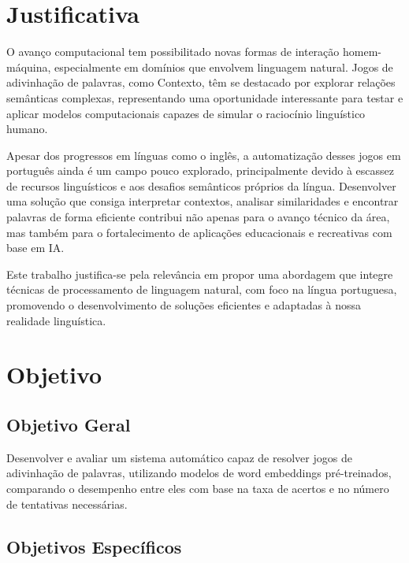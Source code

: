 \section{Justificativa}

O avanço computacional tem possibilitado novas formas de interação homem-máquina, especialmente em domínios que envolvem linguagem natural. Jogos de adivinhação de palavras, como Contexto, têm se destacado por explorar relações semânticas complexas, representando uma oportunidade interessante para testar e aplicar modelos computacionais capazes de simular o raciocínio linguístico humano.

Apesar dos progressos em línguas como o inglês, a automatização desses jogos em português ainda é um campo pouco explorado, principalmente devido à escassez de recursos linguísticos e aos desafios semânticos próprios da língua. Desenvolver uma solução que consiga interpretar contextos, analisar similaridades e encontrar palavras de forma eficiente contribui não apenas para o avanço técnico da área, mas também para o fortalecimento de aplicações educacionais e recreativas com base em IA.

Este trabalho justifica-se pela relevância em propor uma abordagem que integre técnicas de processamento de linguagem natural, com foco na língua portuguesa, promovendo o desenvolvimento de soluções eficientes e adaptadas à nossa realidade linguística.
 
\section{Objetivo}

\subsection{ Objetivo Geral}


Desenvolver e avaliar um sistema automático capaz de resolver jogos de adivinhação de palavras, utilizando modelos de word embeddings pré-treinados, comparando o desempenho entre eles com base na taxa de acertos e no número de tentativas necessárias.

\subsection{Objetivos Específicos}

